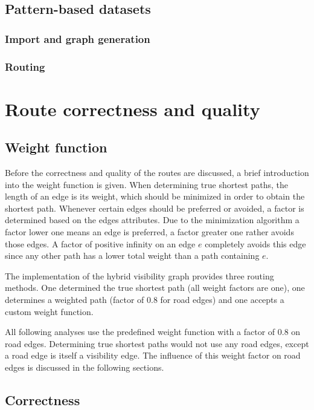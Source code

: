 	
	\subsection{Pattern-based datasets}
	
		\subsubsection{Import and graph generation}
		
		\subsubsection{Routing}
		
\section{Route correctness and quality}

	\subsection{Weight function}
	
		Before the correctness and quality of the routes are discussed, a brief introduction into the weight function is given.
		When determining true shortest paths, the length of an edge is its weight, which should be minimized in order to obtain the shortest path.
		Whenever certain edges should be preferred or avoided, a factor is determined based on the edges attributes.
		Due to the minimization algorithm a factor lower one means an edge is preferred, a factor greater one rather avoids those edges.
		A factor of positive infinity on an edge $e$ completely avoids this edge since any other path has a lower total weight than a path containing $e$.
		
		The implementation of the hybrid visibility graph provides three routing methods.
		One determined the true shortest path (all weight factors are one), one determines a weighted path (factor of 0.8 for road edges) and one accepts a custom weight function.
		
		All following analyses use the predefined weight function with a factor of 0.8 on road edges.
		Determining true shortest paths would not use any road edges, except a road edge is itself a visibility edge.
		The influence of this weight factor on road edges is discussed in the following sections.

	\subsection{Correctness}
	\label{subsec:correctness}
	
